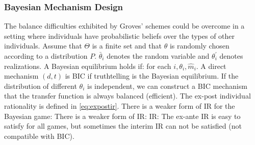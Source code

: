 \documentclass[10pt]{report}
\begin{document}
\subsubsection{Bayesian Mechanism Design}
The balance difficulties exhibited by Groves’ schemes could be overcome in a setting where individuals have probabilistic beliefs over the types of other individuals. Assume that $\Theta$ is a finite set and that $\theta$ is randomly chosen according to a distribution $P$. $\bar{\theta}_i$ denotes the random variable and $\theta_i^\prime$ denotes realizations. A Bayesian equilibrium holds if:
for each $i,\theta_i,\widehat{m}_i$. A direct mechanism $(d,t)$ is BIC if truthtelling is the Bayesian equilibrium.
If the distribution of different $\theta_i$ is independent, we can construct a BIC mechanism that the transfer function is always balanced (efficient).
The ex-post individual rationality is defined in \ref{eq:expostir}. There is a weaker form of IR for the Bayesian game:
There is a weaker form of IR:  IR:
The ex-ante IR is easy to satisfy for all games, but sometimes the interim IR can not be satisfied (not compatible with BIC).
\begin{center}
\end{center}
\end{document}
